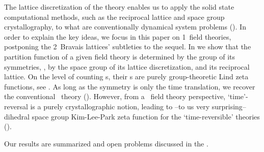 The lattice discretization of the theory enables us to apply the
solid state computational methods, such as the reciprocal lattice and
space group crystallography, to what are conventionally dynamical
system problems (). In order to explain the
key ideas,
we focus in this paper on 1\dmn\ field theories, postponing the
2\dmn\ Bravais lattices' subtleties to the sequel.
In  we show that the partition function of a
given field theory is determined by the group of its symmetries, \ie,
by the space group of its lattice discretization,
and its reciprocal lattice.
On the level of counting {\lattstate}s, their {\tzeta}s are purely
group-theoretic Lind zeta functions, see .
As long as the symmetry is only the time translation, we recover the
conventional \po\ theory
().
However, from a \spt\ field theory perspective, `time'-reversal is a
purely crystallographic notion, leading to --to us very surprising--
dihedral space group Kim-Lee-Park zeta function
for the  `time-reversible' theories
().

Our results are summarized and open problems discussed in the
.
